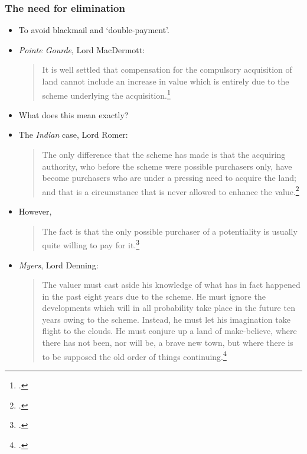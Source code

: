 \documentclass{beamer}
\begin{document}
\begin{frame}
\frametitle{The need for elimination}
\begin{itemize} \item To avoid blackmail and `double-payment'.
\item {\it Pointe Gourde}, Lord MacDermott:
\begin{quote}
It is well settled that compensation for the compulsory acquisition of
land cannot include an increase in value which is entirely due to the
scheme underlying the acquisition.\footcite[572]{gourde47}
\end{quote}
\pause
\item What does this mean exactly?
\end{itemize}
\end{frame}

\begin{frame}
\begin{itemize}
\item The {\it Indian} case, Lord Romer:
\begin{quote}
The only difference that the scheme has made is that the acquiring
authority, who before the scheme were possible purchasers only, have
become purchasers who are under a pressing need to acquire the
land; and that is a circumstance that is never allowed to enhance the
value.\footcite[319]{indian39}
\end{quote}
\pause 
\item However,
\begin{quote}
The fact is that the only possible purchaser of a potentiality is
usually quite willing to pay for it.\footcite[216-217]{indian39}
\end{quote}
\end{itemize}
\end{frame}

\begin{frame}
\begin{itemize} \item {\it Myers}, Lord Denning:
\begin{quote}
The valuer must cast aside his knowledge of what has in fact
happened in the past eight years due to the scheme. He must ignore
the developments which will in all probability take place in the future
ten years owing to the scheme. Instead, he must let his imagination
take flight to the clouds. He must conjure up a land of make-believe,
where there has not been, nor will be, a brave new town, but where
there is to be supposed the old order of things continuing.\footcite[704]{myers74}
\end{quote}
\end{itemize}
\end{frame}
\end{document}
